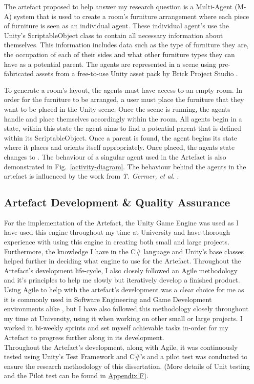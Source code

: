 The artefact proposed to help answer my research question is a Multi-Agent (M-A) system that is used to create a room's furniture arrangement where each piece of furniture is seen as an individual agent. These individual agent's use the Unity's \cite{unity} ScriptableObject class to contain all necessary information about themselves. This information includes data such as the type of furniture they are, the occupation of each of their sides and what other furniture types they can have as a potential parent. The agents are represented in a scene using pre-fabricated assets from a free-to-use Unity asset pack by Brick Project Studio \cite{brick-project}.

To generate a room's layout, the agents must have access to an empty room. In order for the furniture to be arranged, a user must place the furniture that they want to be placed in the Unity scene. Once the scene is running, the agents handle and place themselves accordingly within the room.
All agents begin in a  state, within this state the agent aims to find a potential parent that is defined within its ScriptableObject. Once a parent is found, the agent begins its  state where it places and orients itself appropriately. Once placed, the agents state changes to . The behaviour of a singular agent used in the Artefact is also demonstrated in Fig.~\ref{activity-diagram}.
The behaviour behind the agents in the artefact is influenced by the work from \textit{T. Germer, et al.} \cite{real-time-walkthroughs}.

\subsection{Artefact Development \& Quality Assurance} 
For the implementation of the Artefact, the Unity Game Engine \cite{unity} was used as I have used this engine throughout my time at University and have thorough experience with using this engine in creating both small and large projects. Furthermore, the knowledge I have in the C\# language and Unity's base classes helped further in deciding what engine to use for the Artefact.
Throughout the Artefact's development life-cycle, I also closely followed an Agile methodology and it's principles to help me slowly but iteratively develop a finished product. Using Agile to help with the artefact's development was a clear choice for me as it is commonly used in Software Engineering and Game Development environments alike \cite{game-dev-agile}, but I have also followed this methodology closely throughout my time at University, using it when working on other small or large projects. I worked in bi-weekly sprints and set myself achievable tasks in-order for my Artefact to progress further along in its development.
\\
Throughout the Artefact's development, along with Agile, it was continuously tested using Unity's Test Framework \cite{unit-unit-testing} and C\#'s \cite{nunit-framework} and a pilot test was conducted to ensure the research methodology of this dissertation. (More details of Unit testing and the Pilot test can be found in \hyperref[append:f]{Appendix F}).